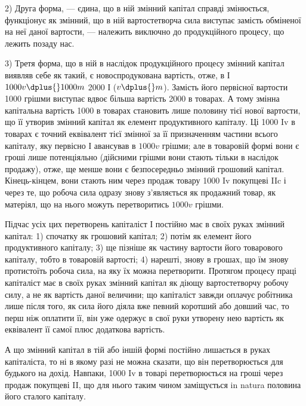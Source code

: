 2) Друга форма, — єдина, що в ній змінний капітал справді змінюється,
функціонує як змінний, що в ній вартостетворча сила виступає замість
обміненої на неї даної вартости, — належить виключно до продукційного
процесу, що лежить позаду нас.

3) Третя форма, що в ній в наслідок продукційного процесу змінний
капітал виявляв себе як такий, є новоспродукована вартість, отже,
в І \deq{} $1000 v \dplus{} 1000 m$ \deq{} 2000 І ($v \dplus{} m$). Замість його первісної вартости \deq{}
1000 грішми виступає вдвоє більша вартість \deq{} 2000 в товарах.
А тому змінна капітальна вартість \deq{} 1000 в товарах становить лише
половину тієї нової вартости, що її утворив змінний капітал як елемент
продуктивного капіталу. Ці 1000 Iv в товарах є точний еквівалент тієї
змінної за її призначенням частини всього капіталу, яку первісно І авансував
в $1000v$ грішми; але в товаровій формі вони є гроші лише потенціяльно
(дійсними грішми вони стають тільки в наслідок продажу), отже,
ще менше вони є безпосередньо змінний грошовий капітал. Кінець-кінцем,
вони стають ним через продаж товару 1000 Iv покупцеві IIc і через
те, що робоча сила одразу знову з’являється як продажний товар, як
матеріял, що на нього можуть перетворитись $1000v$ грішми.

Підчас усіх цих перетворень капіталіст І постійно має в своїх руках
змінний капітал: 1) спочатку як грошовий капітал; 2) потім як елемент
його продуктивного капіталу; 3) ще пізніше як частину вартости його
товарового капіталу, тобто в товаровій вартості; 4) нарешті, знову в грошах,
що їм знову протистоїть робоча сила, на яку їх можна перетворити.
Протягом процесу праці капіталіст має в своїх руках змінний капітал як
діющу вартостетворчу робочу силу, а не як вартість даної величини;
що капіталіст завжди оплачує робітника лише після того, як сила його
діяла вже певний коротший або довший час, то перш ніж оплатити її,
він уже одержує в свої руки утворену нею вартість як еквівалент її
самої плюс додаткова вартість.

А що змінний капітал в тій або іншій формі постійно
лишається в руках капіталіста, то ні в якому
разі не можна сказати, що він перетворюється для будького
на дохід. Навпаки, 1000 Iv в товарі перетворюється на гроші
через продаж покупцеві II, що для нього таким чином заміщується
in natura половина його сталого капіталу.

